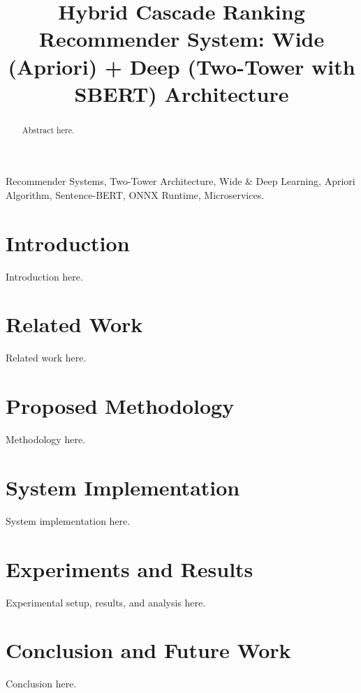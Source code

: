 \documentclass[10pt,conference]{IEEEtran}
\begin{document}
\title{Hybrid Cascade Ranking Recommender System: Wide (Apriori) + Deep (Two-Tower with SBERT) Architecture}

\author{
}

\maketitle

\begin{abstract}
Abstract here.
\end{abstract}

\begin{IEEEkeywords}
Recommender Systems, Two-Tower Architecture, Wide \& Deep Learning, Apriori Algorithm, Sentence-BERT, ONNX Runtime, Microservices.
\end{IEEEkeywords}

\section{Introduction}
\label{sec:intro}
Introduction here.

\section{Related Work}
\label{sec:related_work}
Related work here.

\section{Proposed Methodology}
\label{sec:method}
Methodology here.

\section{System Implementation}
\label{sec:implementation}
System implementation here.

\section{Experiments and Results}
\label{sec:experiments}
Experimental setup, results, and analysis here.

\section{Conclusion and Future Work}
\label{sec:conclusion}
Conclusion here.



\end{document}
